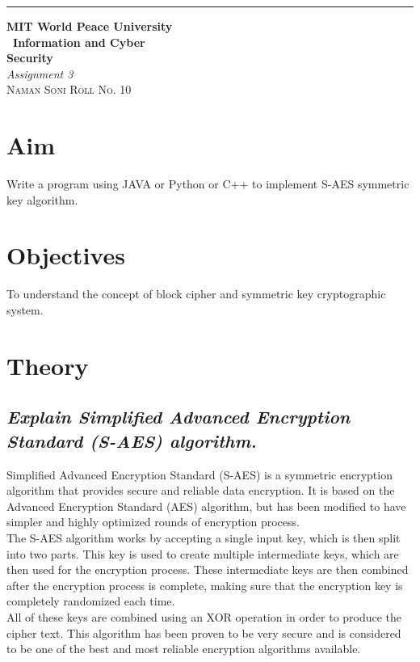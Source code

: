 \documentclass{article}
\begin{document}
\begin{titlepage} %
	
	\raggedleft\rule{1pt}{\textheight} %
	\hspace{0.05\textwidth} %
	\parbox[b]{0.75\textwidth}
	{ %
		
		{\Huge\bfseries MIT World Peace University \\[0.5\baselineskip] \ Information and Cyber \\ Security}\\[2\baselineskip] %
		{\large\textit{Assignment 3}}\\[4\baselineskip] %
		{\Large\textsc{Naman Soni Roll No. 10}} %
		
		\vspace{0.5\textheight} %
	}
	
\end{titlepage}
\tableofcontents
\pagebreak
\section{\textbf{Aim}}
Write a program using JAVA or Python or C++ to implement S-AES symmetric key algorithm.
\section{\textbf{Objectives}}
To understand the concept of block cipher and symmetric key cryptographic system.
\section{\textbf{Theory}}
\subsection{\textbf{\textit{Explain Simplified Advanced Encryption Standard (S-AES) algorithm.}}}
Simplified Advanced Encryption Standard (S-AES) is a symmetric encryption algorithm that provides secure and reliable data encryption. It is based on the Advanced Encryption Standard (AES) algorithm, but has been modified to have simpler and highly optimized rounds of encryption process.\\
The S-AES algorithm works by accepting a single input key, which is then split into two parts. This key is used to create multiple intermediate keys, which are then used for the encryption process. These intermediate keys are then combined after the encryption process is complete, making sure that the encryption key is completely randomized each time.\\
All of these keys are combined using an XOR operation in order to produce the cipher text. This algorithm has been proven to be very secure and is considered to be one of the best and most reliable encryption algorithms available.
\end{document}

